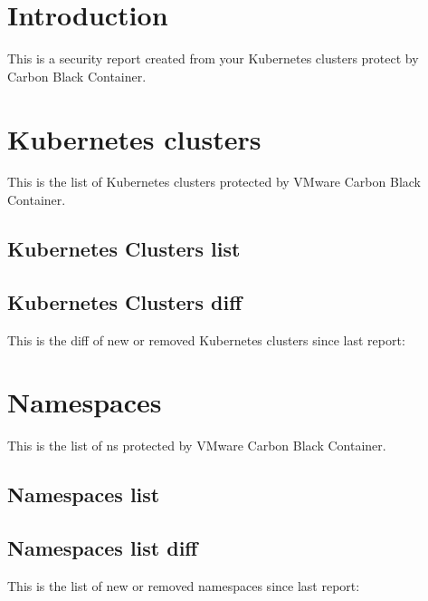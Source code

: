 \section{Introduction}

This is a security report created from your Kubernetes clusters protect by Carbon Black Container.

\vskip15pt
\par



\section{Kubernetes clusters}

This is the list of Kubernetes clusters protected by VMware Carbon Black Container.
\vskip15pt

\subsection{Kubernetes Clusters list}

\subsection{Kubernetes Clusters diff}
This is the diff of new or removed Kubernetes clusters since last report:
\vskip10pt


\section{Namespaces}

This is the list of \gls{ns} protected by VMware Carbon Black Container.
\vskip15pt

\subsection{Namespaces list}

\subsection{Namespaces list diff}
This is the list of new or removed namespaces since last report:
\vskip10pt


